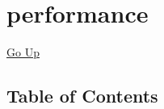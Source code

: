 \chapter*{\color{headtoc} performance}
\hypertarget{ecldoc:toc:root/performance}{}
\hyperlink{ecldoc:toc:}{Go Up}


\section*{Table of Contents}
{\renewcommand{\arraystretch}{1.5}
\begin{longtable}{|p{\textwidth}|}
\hline
\end{longtable}
}

